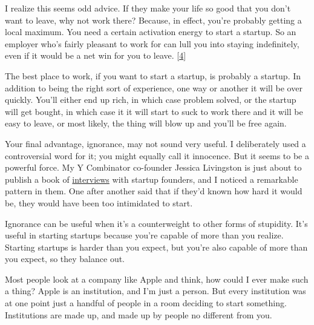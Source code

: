 I realize this
                    seems odd advice. If they make your life so good that you
                    don't want to leave, why not work there? Because, in effect,
                    you're probably getting a local maximum. You need a certain
                    activation energy to start a startup. So an employer who's
                    fairly pleasant to work for can lull you into staying
                    indefinitely, even if it would be a net win for you to
                    leave.
                    [\href{\#f4n}{4}]

The best place to work, if you want to start a
                    startup, is probably a startup. In addition to being the
                    right sort of experience, one way or another it will be over
                    quickly. You'll either end up rich, in which case problem
                    solved, or the startup will get bought, in which case it it
                    will start to suck to work there and it will be easy to
                    leave, or most likely, the thing will blow up and you'll be
                    free again.

Your final advantage, ignorance, may
                    not sound very useful. I deliberately used a controversial
                    word for it; you might equally call it innocence. But it
                    seems to be a powerful force. My Y Combinator co-founder
                    Jessica Livingston is just about to publish a book of
                    \href{http://www.amazon.com/gp/product/1590597141}{interviews}
                    with startup founders, and I noticed a remarkable pattern in
                    them. One after another said that if they'd known how hard
                    it would be, they would have been too intimidated to
                    start.

Ignorance can be useful when it's a
                    counterweight to other forms of stupidity. It's useful in
                    starting startups because you're capable of more than you
                    realize. Starting startups is harder than you expect, but
                    you're also capable of more than you expect, so they balance
                    out.

Most people look at a company like Apple and
                    think, how could I ever make such a thing? Apple is an
                    institution, and I'm just a person. But every institution
                    was at one point just a handful of people in a room deciding
                    to start something. Institutions are made up, and made up by
                    people no different from you.

